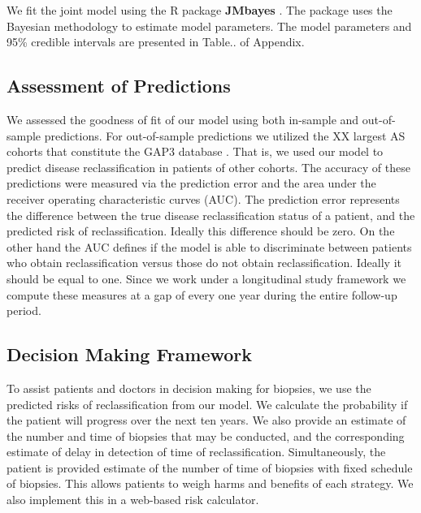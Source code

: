 We fit the joint model using the R package \textbf{JMbayes} \citep{rizopoulosJMbayes}. The package uses the Bayesian methodology to estimate model parameters. The model parameters and 95\% credible intervals are presented in Table.. of Appendix.

\subsection{Assessment of Predictions}
We assessed the goodness of fit of our model using both in-sample and out-of-sample predictions. For out-of-sample predictions we utilized the XX largest AS cohorts that constitute the GAP3 database \citep{gap3_2018}. That is, we used our model to predict disease reclassification in patients of other cohorts. The accuracy of these predictions were measured via the prediction error and the area under the receiver operating characteristic curves (AUC). The prediction error represents the difference between the true disease reclassification status of a patient, and the predicted risk of reclassification. Ideally this difference should be zero. On the other hand the AUC defines if the model is able to discriminate between patients who obtain reclassification versus those do not obtain reclassification. Ideally it should be equal to one. Since we work under a longitudinal study framework we compute these measures at a gap of every one year during the entire follow-up period.

\subsection{Decision Making Framework}
To assist patients and doctors in decision making for biopsies, we use the predicted risks of reclassification from our model. We calculate the probability if the patient will progress over the next ten years. We also provide an estimate of the number and time of biopsies that may be conducted, and the corresponding estimate of delay in detection of time of reclassification. Simultaneously, the patient is provided estimate of the number of time of biopsies with fixed schedule of biopsies. This allows patients to weigh harms and benefits of each strategy. We also implement this in a web-based risk calculator.